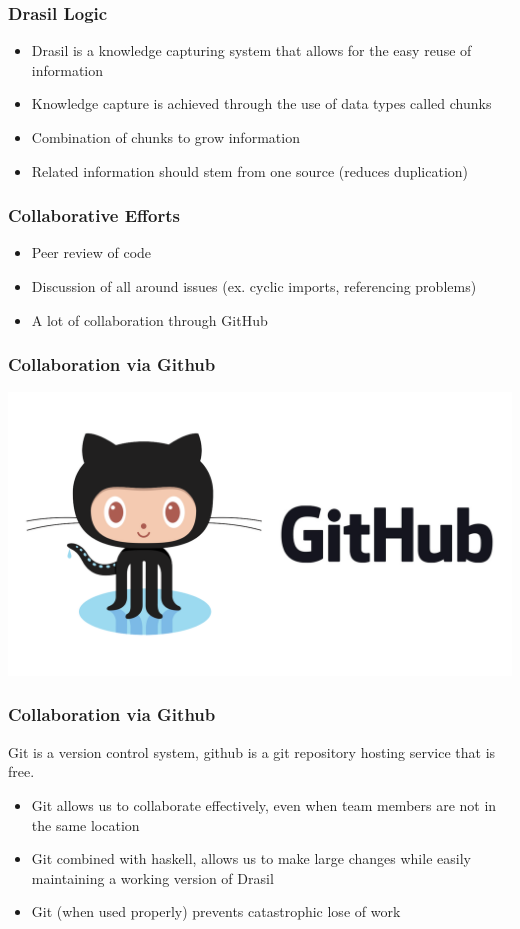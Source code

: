 \documentclass{beamer}
\begin{document}
\begin{frame}
\frametitle{Drasil Logic}
\begin{itemize}
 \item<1-> Drasil is a knowledge capturing system that allows for the easy reuse of information
 \item<2-> Knowledge capture is achieved through the use of data types called chunks
 \item<3-> Combination of chunks to grow information
 \item<4-> Related information should stem from one source (reduces duplication)
\end{itemize}
\end{frame}

\begin{frame}
\frametitle{Collaborative Efforts}
\begin{itemize}
 \item<1-> Peer review of code\linebreak
 \item<2-> Discussion of all around issues (ex. cyclic imports, referencing problems)\linebreak
 \item<3-> A lot of collaboration through GitHub\linebreak
\end{itemize}
\end{frame}

\begin{frame}
\frametitle{Collaboration via Github}
\includegraphics[scale=0.2]{./Github_Logo.png}
\end{frame}

\begin{frame}
\frametitle{Collaboration via Github}
Git is a version control system, github is a git repository hosting service that is \alert{free}.
\begin{itemize}
 \item<1-> Git allows us to collaborate effectively, even when team members are not in the same location
 \item<2-> Git combined with haskell, allows us to make large changes while easily maintaining a working version of Drasil
 \item<3-> Git \alert{(when used properly)} prevents catastrophic lose of work
\end{itemize}
\end{frame}
\end{document}
